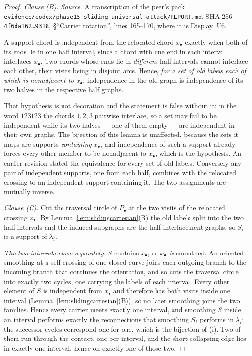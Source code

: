 \begin{proof}
\emph{Clause (B).}
\emph{Source.} A transcription of the peer's pack \texttt{evidence/codex/phase15-sliding-universal-attack/REPORT.md}, SHA-256 \texttt{4f6da162\dots9318}, §``Carrier rotation'', lines 165--170, where it is
Display~U6.

A support chord is independent from the relocated chord $x_\bullet$ exactly when
both of its ends lie in one half interval, since a chord with one end in each
interval interlaces $x_\bullet$. Two chords whose ends lie in \emph{different}
half intervals cannot interlace each other, their visits being in disjoint arcs.
Hence, \emph{for a set of old labels each of which is nonadjacent to
$x_\bullet$}, independence in the old graph is independence of its two halves in
the respective half graphs.

That hypothesis is not decoration and the statement is false without it: in the
word $123123$ the chords $1,2,3$ pairwise interlace, so a set may fail to be
independent while its two halves --- one of them empty --- are independent in
their own graphs. The bijection of this lemma is unaffected, because the sets it
maps are supports \emph{containing} $x_\bullet$, and independence of such a
support already forces every other member to be nonadjacent to $x_\bullet$,
which is the hypothesis. An earlier revision stated the equivalence for every
set of old labels. Conversely any pair of independent supports, one from
each half, combines with the relocated crossing to an independent support
containing it. The two assignments are mutually inverse.

\emph{Clause (C).}
Cut the traversal circle of $P_\bullet$ at the two visits of the relocated
crossing $x_\bullet$. By Lemma~\ref{lem:slidingcartesian}(B) the old labels split
into the two half intervals and the induced subgraphs are the half interlacement
graphs, so $S_i$ is a support of $\lambda_i$.

\emph{The two intervals close separately.} $S$ contains $x_\bullet$, so
$x_\bullet$ \emph{is} smoothed. An oriented smoothing at a self-crossing of one
closed curve joins each outgoing branch to the incoming branch that continues
the orientation, and so cuts the traversal circle into exactly two cycles, one
carrying the labels of each interval. Every other element of $S$ is independent
from $x_\bullet$ and therefore has both visits inside one interval
(Lemma~\ref{lem:slidingcartesian}(B)), so no later smoothing joins the two
families. Hence every carrier meets exactly one interval, and smoothing $S$
inside an interval performs exactly the reconnections that smoothing $S_i$
performs in $\lambda_i$; the successor cycles correspond one for one, which is
the bijection of (i). Two of them run through the contact, one per interval,
and the short collapsing edge lies in exactly one interval, hence on exactly one
of those two.


\end{proof}
